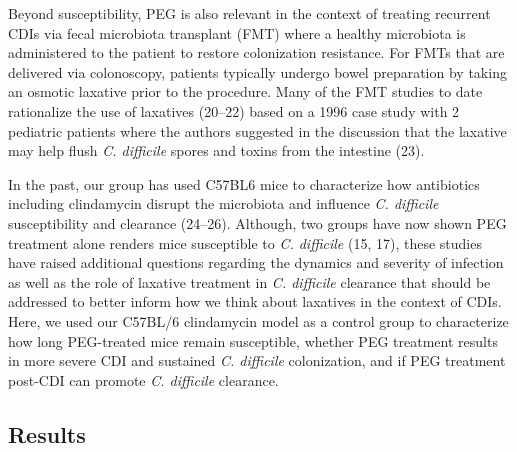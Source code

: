 \documentclass[
  11pt,
]{article}
\begin{document}
Beyond susceptibility, PEG is also relevant in the context of treating
recurrent CDIs via fecal microbiota transplant (FMT) where a healthy
microbiota is administered to the patient to restore colonization
resistance. For FMTs that are delivered via colonoscopy, patients
typically undergo bowel preparation by taking an osmotic laxative prior
to the procedure. Many of the FMT studies to date rationalize the use of
laxatives (20--22) based on a 1996 case study with 2 pediatric patients
where the authors suggested in the discussion that the laxative may help
flush \emph{C. difficile} spores and toxins from the intestine (23).

In the past, our group has used C57BL6 mice to characterize how
antibiotics including clindamycin disrupt the microbiota and influence
\emph{C. difficile} susceptibility and clearance (24--26). Although, two
groups have now shown PEG treatment alone renders mice susceptible to
\emph{C. difficile} (15, 17), these studies have raised additional
questions regarding the dynamics and severity of infection as well as
the role of laxative treatment in \emph{C. difficile} clearance that
should be addressed to better inform how we think about laxatives in the
context of CDIs. Here, we used our C57BL/6 clindamycin model as a
control group to characterize how long PEG-treated mice remain
susceptible, whether PEG treatment results in more severe CDI and
sustained \emph{C. difficile} colonization, and if PEG treatment
post-CDI can promote \emph{C. difficile} clearance.

\hypertarget{results}{%
\subsection{Results}\label{results}}
\end{document}
